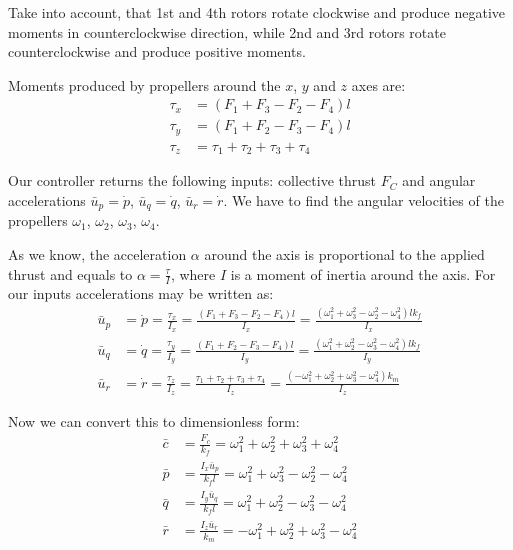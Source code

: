 \documentclass{article}
\begin{document}
    Take into account, that 1st and 4th rotors rotate clockwise and produce negative moments in counterclockwise direction, while 2nd and 3rd rotors rotate counterclockwise and produce positive moments.

    Moments produced by propellers around the $x$, $y$ and $z$ axes are:
    \begin{align*}
        \tau_x &= (F_1+F_3-F_2-F_4)l \\
        \tau_y &= (F_1+F_2-F_3-F_4)l \\
        \tau_z &= \tau_1+\tau_2+\tau_3+\tau_4
    \end{align*}

    Our controller returns the following inputs: collective thrust $F_C$ and angular accelerations $\bar{u}_p = \dot{p}$, $\bar{u}_q = \dot{q}$, $\bar{u}_r = \dot{r}$. We have to find the angular velocities of the propellers $\omega_1$, $\omega_2$, $\omega_3$, $\omega_4$.

    As we know, the acceleration $\alpha$ around the axis is proportional to the applied thrust and equals to $\alpha=\frac{\tau}{I}$, where $I$ is a moment of inertia around the axis. For our inputs accelerations may be written as:
    \begin{align*}
        \bar{u}_p &= \dot{p} = \frac{\tau_x}{I_x} = \frac{(F_1+F_3-F_2-F_4)l}{I_x} = \frac{(\omega_1^2+\omega_3^2-\omega_2^2-\omega_4^2)lk_f}{I_x} \\
        \bar{u}_q &= \dot{q} = \frac{\tau_y}{I_y} = \frac{(F_1+F_2-F_3-F_4)l}{I_y} = \frac{(\omega_1^2+\omega_2^2-\omega_3^2-\omega_4^2)lk_f}{I_y} \\
        \bar{u}_r &= \dot{r} = \frac{\tau_z}{I_z} = \frac{\tau_1+\tau_2+\tau_3+\tau_4}{I_z} = \frac{(-\omega_1^2+\omega_2^2+\omega_3^2-\omega_4^2)k_m}{I_z}
    \end{align*}

    Now we can convert this to dimensionless form:
    \begin{align*}
        \bar{c} &= \frac{F_c}{k_f} = \omega_1^2+\omega_2^2+\omega_3^2+\omega_4^2 \\
        \bar{p} &= \frac{I_x\bar{u}_p}{k_fl} = \omega_1^2+\omega_3^2-\omega_2^2-\omega_4^2 \\
        \bar{q} &= \frac{I_y\bar{u}_q}{k_fl} = \omega_1^2+\omega_2^2-\omega_3^2-\omega_4^2 \\
        \bar{r} &= \frac{I_z\bar{u}_r}{k_m} = -\omega_1^2+\omega_2^2+\omega_3^2-\omega_4^2
    \end{align*}
\end{document}

